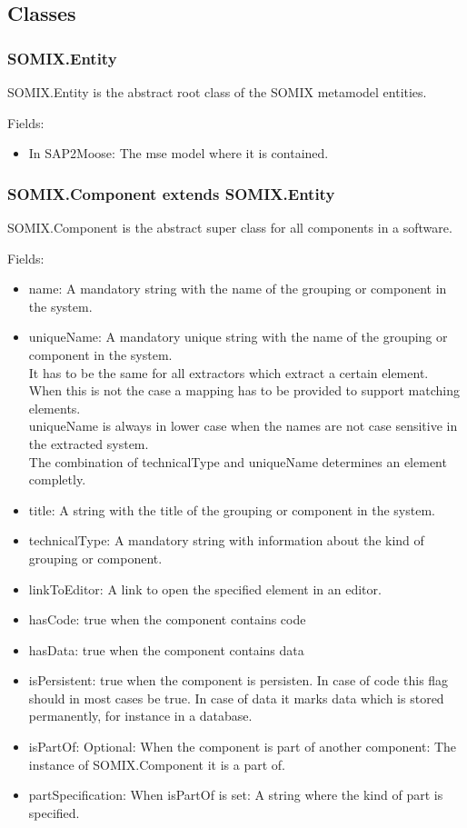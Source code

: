 \documentclass[preprint,12pt]{elsarticle}
\begin{document}
\subsection{Classes}

\subsubsection{SOMIX.Entity}

SOMIX.Entity is the abstract root class of the SOMIX metamodel entities.

Fields:
\begin{itemize}
\item In SAP2Moose: The mse model where it is contained.
\end{itemize}


\subsubsection{SOMIX.Component extends SOMIX.Entity}

SOMIX.Component is the abstract super class for all components in a software.

Fields:
\begin{itemize}
\item name: A mandatory string with the name of the grouping or component in the system.
\item uniqueName: A mandatory unique string with the name of the grouping or component in the system.\\
It has to be the same for all extractors which extract a certain element. When this is not the case a mapping has to be provided to support matching elements.\\
uniqueName is always in lower case when the names are not case sensitive in the extracted system.\\
The combination of technicalType and uniqueName determines an element completly.
\item title: A string with the title of the grouping or component in the system.
\item technicalType: A mandatory string with information about the kind of grouping or component.
\item linkToEditor: A link to open the specified element in an editor.
\item hasCode: true when the component contains code
\item hasData: true when the component contains data
\item isPersistent: true when the component is persisten. In case of code this flag should in most cases be true. In case of data it marks data which is stored permanently, for instance in a database.
\item isPartOf: Optional: When the component is part of another component: The instance of SOMIX.Component it is a part of. 
\item partSpecification: When isPartOf is set: A string where the kind of part is specified.
\end{itemize}
\end{document}
